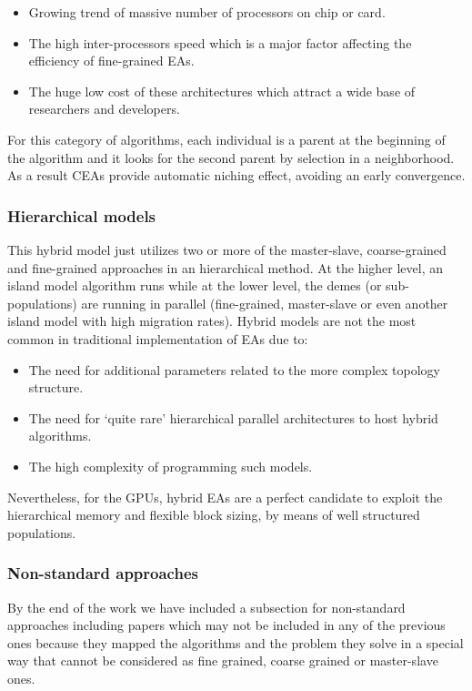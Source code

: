 \documentclass[Afour,sageh,times]{sagej}
\begin{document}
\begin{itemize}
\item Growing trend of massive number of processors on chip or card. 
\item The high inter-processors speed which is a major factor affecting the efficiency of fine-grained EAs. 
\item The huge low cost of these architectures which attract a wide base of researchers and developers. 
\end{itemize}

For this category of algorithms, each individual is a parent at the beginning of the algorithm and it looks for the second parent by selection in a neighborhood. As a result CEAs provide automatic niching effect, avoiding an early convergence. 


\subsubsection{Hierarchical models}
This hybrid model just utilizes two or more of the master-slave, coarse-grained and fine-grained approaches in an hierarchical method. At the higher level, an island model algorithm runs while at the lower level, the demes (or sub-populations) are running in parallel (fine-grained, master-slave or even another island model with high migration rates). Hybrid models are not the most common in traditional implementation of EAs due to:
\begin{itemize}
 \item The need for additional parameters related to the more complex topology structure. 
 \item The need for `quite rare' hierarchical parallel architectures to host hybrid algorithms. 
\item The high complexity of programming such models. 
\end{itemize}

Nevertheless, for the GPUs, hybrid EAs are a perfect candidate to exploit the hierarchical memory and flexible block sizing, by means of well structured populations. 


\subsubsection{Non-standard approaches}
By the end of the work we have included a subsection for non-standard approaches \citep{DBLP:conf/gecco/PospichalMOSJ11} including  papers which may not be included in any of the previous ones because they mapped the algorithms and the problem they solve in a special way that cannot be considered as fine grained, coarse grained or master-slave ones.
\end{document}
